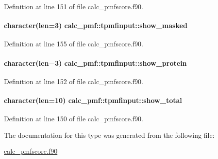 Definition at line 151 of file calc\-\_\-pmfscore.\-f90.

\hypertarget{structcalc__pmf_1_1tpmfinput_a4aa3b6001cae5d27f9969f2b481572c5}{
\paragraph[{show\-\_\-masked}]{\setlength{\rightskip}{0pt plus 5cm}character(len=3) calc\-\_\-pmf\-::tpmfinput\-::show\-\_\-masked}}\label{structcalc__pmf_1_1tpmfinput_a4aa3b6001cae5d27f9969f2b481572c5}


Definition at line 155 of file calc\-\_\-pmfscore.\-f90.

\hypertarget{structcalc__pmf_1_1tpmfinput_a9d0b01364dd15c970dcd35380a634e36}{
\paragraph[{show\-\_\-protein}]{\setlength{\rightskip}{0pt plus 5cm}character(len=3) calc\-\_\-pmf\-::tpmfinput\-::show\-\_\-protein}}\label{structcalc__pmf_1_1tpmfinput_a9d0b01364dd15c970dcd35380a634e36}


Definition at line 152 of file calc\-\_\-pmfscore.\-f90.

\hypertarget{structcalc__pmf_1_1tpmfinput_a52344e226e3919a5839c574a7b66f02f}{
\paragraph[{show\-\_\-total}]{\setlength{\rightskip}{0pt plus 5cm}character(len=10) calc\-\_\-pmf\-::tpmfinput\-::show\-\_\-total}}\label{structcalc__pmf_1_1tpmfinput_a52344e226e3919a5839c574a7b66f02f}


Definition at line 150 of file calc\-\_\-pmfscore.\-f90.



The documentation for this type was generated from the following file\-:\begin{DoxyCompactItemize}
\item 
\hyperlink{calc__pmfscore_8f90}{calc\-\_\-pmfscore.\-f90}\end{DoxyCompactItemize}

